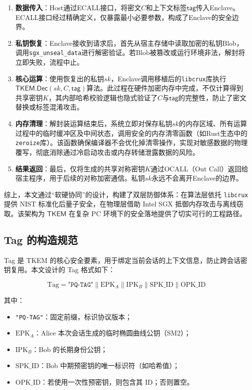 \begin{enumerate}
    \item \textbf{数据传入}：Host通过ECALL接口，将密文$C$和上下文标签$\mathsf{tag}$传入Enclave。ECALL接口经过精确定义，仅暴露最小必要参数，构成了Enclave的安全边界。
    
    \item \textbf{私钥恢复}：Enclave接收到请求后，首先从宿主存储中读取加密的私钥Blob，调用\texttt{sgx\_unseal\_data}进行解密验证。若Blob被篡改或运行环境非法，解封将立即失败，流程中止。
    
    \item \textbf{核心运算}：使用恢复出的私钥$sk$，Enclave调用移植后的\texttt{libcrux}库执行$\mathsf{TKEM}.\mathsf{Dec}(sk, C, \mathsf{tag})$算法。此过程在硬件加密内存中完成，不仅计算得到共享密钥$K$，其内部哈希校验逻辑也隐式验证了$C$与$\mathsf{tag}$的完整性，防止了密文替换或标签混淆攻击。
    
    \item \textbf{内存清理}：解封装运算结束后，系统立即对保存私钥$sk$的内存区域、所有运算过程中的临时缓冲区及中间状态，调用安全的内存清零函数（如Rust生态中的\texttt{zeroize}库）。该函数确保编译器不会优化掉清零操作，实现对敏感数据的物理覆写，彻底消除通过冷启动攻击或内存转储泄露数据的风险。
    
    \item \textbf{结果返回}：最后，仅将生成的共享对称密钥$K$通过OCALL（Out Call）返回给宿主程序，用于后续的对称加密通信。私钥$sk$永远不会离开Enclave的边界。
\end{enumerate}


综上，本文通过“软硬协同”的设计，构建了双层防御体系：在算法层依托 \texttt{libcrux} 提供 NIST 标准化后量子安全，在物理层借助 Intel SGX 抵御内存攻击与离线窃取。该架构为 $\mathsf{TKEM}$ 在复杂 PC 环境下的安全落地提供了切实可行的工程路径。

\subsection{Tag 的构造规范}\label{sec:tag_construction}
Tag 是 TKEM 的核心安全要素，用于绑定当前会话的上下文信息，防止跨会话密钥复用。本文设计的 Tag 格式如下：

\[
\text{Tag} = \texttt{"PQ-TAG"} \parallel \text{EPK}_A \parallel \text{IPK}_B \parallel \text{SPK\_ID} \parallel \text{OPK\_ID}
\]

其中：
\begin{itemize}
    \item \texttt{"PQ-TAG"}：固定前缀，标识协议版本；
    \item $\text{EPK}_A$：Alice 本次会话生成的临时椭圆曲线公钥（SM2）；
    \item $\text{IPK}_B$：Bob 的长期身份公钥；
    \item $\text{SPK\_ID}$：Bob 中期预密钥的唯一标识符（如哈希值）；
    \item $\text{OPK\_ID}$：若使用一次性预密钥，则包含其 ID；否则置空。
\end{itemize}

